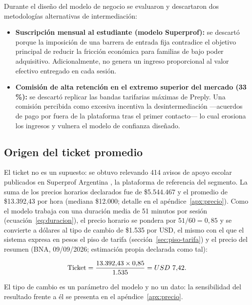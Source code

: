 Durante el diseño del modelo de negocio se evaluaron y descartaron dos
metodologías alternativas de intermediación:

\begin{itemize}
    \item \textbf{Suscripción mensual al estudiante (modelo Superprof):} se
          descartó porque la imposición de una barrera de entrada fija
          contradice el objetivo principal de reducir la fricción
          económica para familias de bajo poder adquisitivo.
          Adicionalmente, no genera un ingreso proporcional al valor
          efectivo entregado en cada sesión.
    \item \textbf{Comisión de alta retención en el extremo superior del
          mercado (33\,\%):} se descartó replicar las bandas tarifarias
          máximas de Preply. Una comisión percibida como excesiva
          incentiva la desintermediación —acuerdos de pago por fuera de
          la plataforma tras el primer contacto— lo cual erosiona los
          ingresos y vulnera el modelo de confianza diseñado.
\end{itemize}

\subsection{Origen del ticket promedio}\label{sec:origen-ticket}

El ticket no es un supuesto: se obtuvo relevando 414 avisos de apoyo
escolar publicados en Superprof Argentina \citep{superprof}, la
plataforma de referencia del segmento. La suma de los precios horarios
declarados fue de \$5.544.467 y el promedio de \$13.392,43 por hora
(mediana \$12.000; detalle en el apéndice~\ref{apx:precio}). Como el
modelo trabaja con una duración media de 51 minutos por sesión
(ecuación~\ref{eq:duracion}), el precio horario se pondera por
$51/60 = 0{,}85$ y se convierte a dólares al tipo de cambio de
\$1.535 por USD, el mismo con el que el sistema expresa en pesos el piso
de tarifa (sección~\ref{sec:piso-tarifa}) y el precio del resumen (BNA,
09/09/2026; estimación propia declarada como tal):

\begin{equation}
    \text{Ticket} = \frac{13.392{,}43 \times 0{,}85}{1.535} = USD~7{,}42.
    \label{eq:ticket}
\end{equation}

El tipo de cambio es un parámetro del modelo y no un dato: la
sensibilidad del resultado frente a él se presenta en el
apéndice~\ref{apx:precio}.

